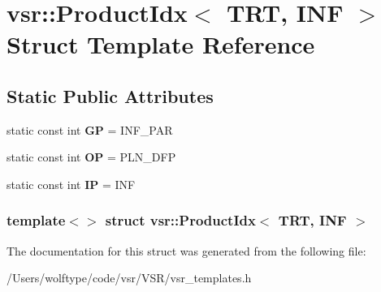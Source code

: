 \hypertarget{structvsr_1_1_product_idx_3_01_t_r_t_00_01_i_n_f_01_4}{\section{vsr\-:\-:Product\-Idx$<$ T\-R\-T, I\-N\-F $>$ Struct Template Reference}
\label{structvsr_1_1_product_idx_3_01_t_r_t_00_01_i_n_f_01_4}
}
\subsection*{Static Public Attributes}
\begin{DoxyCompactItemize}
\item 
\hypertarget{structvsr_1_1_product_idx_3_01_t_r_t_00_01_i_n_f_01_4_a077721284120b7dbebe9b514f5efc080}{static const int {\bfseries G\-P} = I\-N\-F\-\_\-\-P\-A\-R}\label{structvsr_1_1_product_idx_3_01_t_r_t_00_01_i_n_f_01_4_a077721284120b7dbebe9b514f5efc080}

\item 
\hypertarget{structvsr_1_1_product_idx_3_01_t_r_t_00_01_i_n_f_01_4_aa4fefaa2964e91302d892ef16f504872}{static const int {\bfseries O\-P} = P\-L\-N\-\_\-\-D\-F\-P}\label{structvsr_1_1_product_idx_3_01_t_r_t_00_01_i_n_f_01_4_aa4fefaa2964e91302d892ef16f504872}

\item 
\hypertarget{structvsr_1_1_product_idx_3_01_t_r_t_00_01_i_n_f_01_4_a4347c9ff86321387d3d66daf5e6eea2d}{static const int {\bfseries I\-P} = I\-N\-F}\label{structvsr_1_1_product_idx_3_01_t_r_t_00_01_i_n_f_01_4_a4347c9ff86321387d3d66daf5e6eea2d}

\end{DoxyCompactItemize}
\subsubsection*{template$<$$>$ struct vsr\-::\-Product\-Idx$<$ T\-R\-T, I\-N\-F $>$}



The documentation for this struct was generated from the following file\-:\begin{DoxyCompactItemize}
\item 
/\-Users/wolftype/code/vsr/\-V\-S\-R/vsr\-\_\-templates.\-h\end{DoxyCompactItemize}
